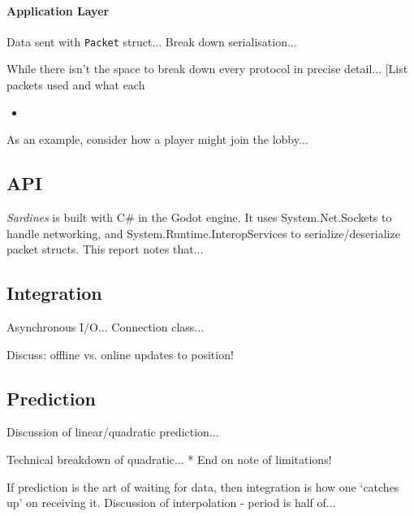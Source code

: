 \documentclass[a4paper, 11pt]{article}
\begin{document}
\begin{flushleft}
\paragraph{Application Layer}

Data sent with \texttt{Packet} struct...
Break down serialisation...

\vspace{5pt}\noindent
While there isn't the space to break down every protocol in precise detail... [List packets used and what each 
\begin{itemize}
\item
\end{itemize}

\vspace{5pt}\noindent
As an example, consider how a player might join the lobby...

\subsection*{API}

\textit{Sardines} is built with C\# in the Godot engine. It uses System.Net.Sockets to handle networking, and System.Runtime.InteropServices to serialize/deserialize packet structs. This report notes that...



\subsection*{Integration}

Asynchronous I/O...
Connection class...

\vspace{5pt}\noindent
Discuss: offline vs. online updates to position!

\subsection*{Prediction}

Discussion of linear/quadratic prediction...


\vspace{5pt}\noindent
Technical breakdown of quadratic...
* End on note of limitations!

\vspace{5pt}\noindent
If prediction is the art of waiting for data, then integration is how one `catches up' on receiving it.
Discussion of interpolation - period is half of...


\end{flushleft}
\end{document}
